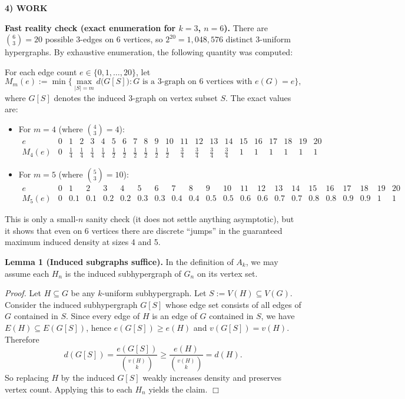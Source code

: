 \medskip
\noindent\textbf{4) WORK}

\textbf{Fast reality check (exact enumeration for $k=3$, $n=6$).}
There are $\binom{6}{3}=20$ possible 3-edges on 6 vertices, so $2^{20}=1{,}048{,}576$ distinct 3-uniform hypergraphs.
By exhaustive enumeration, the following quantity was computed:

For each edge count $e\in\{0,1,\dots,20\}$, let
\[
M_{m}(e):=\min\Big\{\max_{|S|=m} d\big(G[S]\big) : G\text{ is a 3-graph on 6 vertices with }e(G)=e\Big\},
\]
where $G[S]$ denotes the induced 3-graph on vertex subset $S$.
The exact values are:

\begin{itemize}
\item For $m=4$ (where $\binom{4}{3}=4$):
\[\begin{array}{c|ccccccccccccccccccccc}
 e &0&1&2&3&4&5&6&7&8&9&10&11&12&13&14&15&16&17&18&19&20\\\hline
 M_4(e) &0&\tfrac14&\tfrac14&\tfrac14&\tfrac14&\tfrac12&\tfrac12&\tfrac12&\tfrac12&\tfrac12&\tfrac12&\tfrac34&\tfrac34&\tfrac34&\tfrac34&1&1&1&1&1&1
\end{array}\]
\item For $m=5$ (where $\binom{5}{3}=10$):
\[\begin{array}{c|ccccccccccccccccccccc}
 e &0&1&2&3&4&5&6&7&8&9&10&11&12&13&14&15&16&17&18&19&20\\\hline
 M_5(e) &0&0.1&0.1&0.2&0.2&0.3&0.3&0.4&0.4&0.5&0.5&0.6&0.6&0.7&0.7&0.8&0.8&0.9&0.9&1&1
\end{array}\]
\end{itemize}
This is only a small-$n$ sanity check (it does not settle anything asymptotic), but it shows that even on 6 vertices there are discrete ``jumps'' in the guaranteed maximum induced density at sizes 4 and 5.

\medskip
\noindent\textbf{Lemma 1 (Induced subgraphs suffice).}
In the definition of $A_k$, we may assume each $H_n$ is the induced subhypergraph of $G_n$ on its vertex set.

\noindent\emph{Proof.}
Let $H\subseteq G$ be any $k$-uniform subhypergraph. Let $S:=V(H)\subseteq V(G)$.
Consider the induced subhypergraph $G[S]$ whose edge set consists of all edges of $G$ contained in $S$.
Since every edge of $H$ is an edge of $G$ contained in $S$, we have $E(H)\subseteq E(G[S])$, hence $e(G[S])\ge e(H)$ and $v(G[S])=v(H)$.
Therefore
\[
d(G[S])=\frac{e(G[S])}{\binom{v(H)}{k}}\ge \frac{e(H)}{\binom{v(H)}{k}}=d(H).
\]
So replacing $H$ by the induced $G[S]$ weakly increases density and preserves vertex count. Applying this to each $H_n$ yields the claim. \hfill$\Box$

